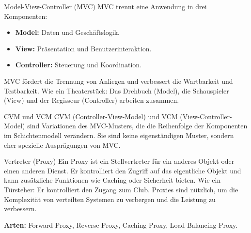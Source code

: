 \documentclass{beamer}
\begin{document}
\begin{frame}{Model-View-Controller (MVC)}
    MVC trennt eine Anwendung in drei Komponenten:
    \begin{itemize}
        \item \textbf{Model:}  Daten und Geschäftslogik.
        \item \textbf{View:}  Präsentation und Benutzerinteraktion.
        \item \textbf{Controller:}  Steuerung und Koordination.
    \end{itemize}
    MVC fördert die Trennung von Anliegen und verbessert die Wartbarkeit und Testbarkeit.  Wie ein Theaterstück: Das Drehbuch (Model), die Schauspieler (View) und der Regisseur (Controller) arbeiten zusammen.
\end{frame}


\begin{frame}{CVM und VCM}
    CVM (Controller-View-Model) und VCM (View-Controller-Model) sind Variationen des MVC-Musters, die die Reihenfolge der Komponenten im Schichtenmodell verändern.  Sie sind keine eigenständigen Muster, sondern eher spezielle Ausprägungen von MVC.
\end{frame}


\begin{frame}{Vertreter (Proxy)}
    Ein Proxy ist ein Stellvertreter für ein anderes Objekt oder einen anderen Dienst.  Er kontrolliert den Zugriff auf das eigentliche Objekt und kann zusätzliche Funktionen wie Caching oder Sicherheit bieten.  Wie ein Türsteher: Er kontrolliert den Zugang zum Club.  Proxies sind nützlich, um die Komplexität von verteilten Systemen zu verbergen und die Leistung zu verbessern.

    \textbf{Arten:} Forward Proxy, Reverse Proxy, Caching Proxy, Load Balancing Proxy.
\end{frame}
\end{document}
